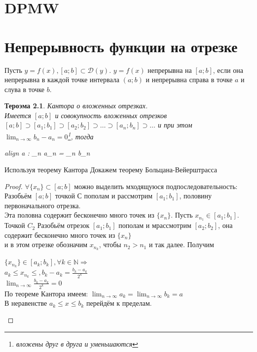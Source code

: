 \documentclass[oneside]{book}
\newcommand{\boxedeq}[2]{\begin{empheq}[box={\fboxsep=6pt\fbox}]{align}\label{#1}#2\end{empheq}}
\newtheorem{thm}{Тероэма}[chapter] %
\begin{document}
\begin{enumerate}
\chapter{DPMW}

\chapter{Непрерывность функции на отрезке\\}
Пусть $y = f(x), [a;b] \subset \mathcal{D}(y)$. $y = f(x)$ непрерывна на $[a;b]$, если она непрерывна в каждой точке интервала $(a;b)$ и
непрерывна справа в точке $a$ и слува в точке $b$.
\begin{thm}
    Кантора о вложенных отрезках. \\
    Имеется $[a;b]$ и совокупность вложенных отрезков $[a;b] \supset [a_1;b_1] \supset [a_2;b_2] \supset \dots \supset [a_n; b_n]
    \supset \dots$ и при этом $\lim_{n \rightarrow \infty}{b_n - a_n} = 0$\footnote{вложены друг в друга и уменьшаются}, тогда
    \boxedeq{eq:*}{
        \exists a \in [a; b] : \lim_{n \rightarrow \infty}{a_n} = \lim_{n \rightarrow \infty}{b_n}
    }
\end{thm}
Используя теорему Кантора Докажем теорему Больцана-Вейерштрасса
\begin{proof}
    $\forall \{x_n\} \subset [a; b]$ можно выделить мходящуюся подпоследовательность:\\
    Разобьём $[a; b]$ точкой С пополам и рассмотрим $[a_1; b_1]$, половину первоначального отрезка.\\
    Эта половна содержит бесконечно много точек из $\{x_n\}$. Пусть $x_{n_1} \in [a_1; b_1]$. \\
    Точкой $C_2$ Разобьём отрезок $[a_1; b_1]$ пополам и мрассмотрим $[a_2; b_2]$, она содержит бесконечно много точек из $\{x_n\}$ \\
    и в этом отрезке обозначим $x_{n_k}$, чтобы $n_2 > n_1$ и так далее. Получим \\
    \begin{center}
        $\{x_{n_k}\} \in [a_k; b_k], \forall k \in \mathbb{N} \Rightarrow$ \\
        $a_k \leq x_{n_k} \leq, b_k - a_k = \frac{b_k - a_k}{2^k}$ \\
        $\lim_{n \rightarrow \infty}{\frac{b_k - a_k}{2^k} = 0}$ \\
        По теореме Кантора имеем: $\lim_{n \rightarrow \infty}{a_k} = \lim_{n \rightarrow \infty}{b_k} = a$\\
        В неравенстве $a_k \leq x \leq b_k$ перейдём к пределам.\\

\end{center}
\end{proof}
\end{enumerate}
\end{document}
